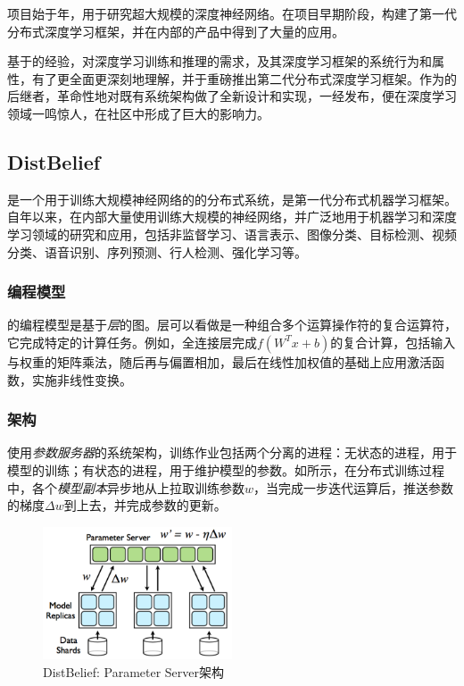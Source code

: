 \begin{content}

项目始于年，用于研究超大规模的深度神经网络。在项目早期阶段，构建了第一代分布式深度学习框架，并在内部的产品中得到了大量的应用。

基于的经验，对深度学习训练和推理的需求，及其深度学习框架的系统行为和属性，有了更全面更深刻地理解，并于重磅推出第二代分布式深度学习框架\tf{}。\tf{}作为的后继者，革命性地对既有系统架构做了全新设计和实现，\tf{}一经发布，便在深度学习领域一鸣惊人，在社区中形成了巨大的影响力。

\subsection{DistBelief}

是一个用于训练大规模神经网络的的分布式系统，是第一代分布式机器学习框架。自年以来，在内部大量使用训练大规模的神经网络，并广泛地用于机器学习和深度学习领域的研究和应用，包括非监督学习、语言表示、图像分类、目标检测、视频分类、语音识别、序列预测、行人检测、强化学习等。

\subsubsection{编程模型}

的编程模型是基于\emph{层}的图。层可以看做是一种组合多个运算操作符的复合运算符，它完成特定的计算任务。例如，全连接层完成$f({W^T}x + b)$的复合计算，包括输入与权重的矩阵乘法，随后再与偏置相加，最后在线性加权值的基础上应用激活函数，实施非线性变换。

\subsubsection{架构}

使用\emph{参数服务器}的系统架构，训练作业包括两个分离的进程：无状态的进程，用于模型的训练；有状态的进程，用于维护模型的参数。如所示，在分布式训练过程中，各个\emph{模型副本}异步地从上拉取训练参数$w$，当完成一步迭代运算后，推送参数的梯度$ \Delta w $到上去，并完成参数的更新。

\begin{figure}[H]
\centering
\includegraphics[width=0.5\textwidth]{figures/parameter-server.png}
\caption{DistBelief: Parameter Server架构}
 \label{fig:parameter-server}
\end{figure}


\end{content}

